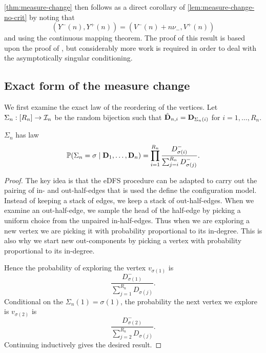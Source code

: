 \cref{thm:measure-change} then follows as a direct corollary of \cref{lem:measure-change-no-crit} by noting that
\begin{equation*}
    \left( 
        Y^-(n), Y^+(n)
     \right) =
    \left( 
        V^-(n) + n \nu_-, V^+(n)
     \right)
\end{equation*}
and using the continuous mapping theorem. The proof of this result is based upon the proof of \cite[Lemma~6.7]{conchon--kerjanStableGraphMetric2020}, but considerably more work is required in order to deal with the asymptotically singular conditioning.

\subsection{Exact form of the measure change}

We first examine the exact law of the reordering of the vertices. Let $\Sigma_n: [R_n] \to {\mathcal I}_n$ be the random bijection such that $\hat{{\mathbf D}}_{n, i} = {\mathbf D}_{\Sigma_n(i)}$ for $i = 1, \ldots, R_n$.

\begin{lemma}
    $\Sigma_n$ has law
    \begin{equation*}
        {\mathbb P}(\Sigma_n = \sigma \mid {\mathbf D}_1, \ldots, {\mathbf D}_n)
        = \prod_{i=1}^{R_n} \frac{D^-_{\sigma(i)}}{\sum_{j=i}^{R_n} D^-_{\sigma(j)}}.
    \end{equation*}
\end{lemma}
\begin{proof}
    The key idea is that the eDFS procedure can be adapted to carry out the pairing of in- and out-half-edges that is used the define the configuration model. Instead of keeping a stack of edges, we keep a stack of out-half-edges. When we examine an out-half-edge, we sample the head of the half-edge by picking a uniform choice from the unpaired in-half-edges. Thus when we are exploring a new vertex we are picking it with probability proportional to its in-degree. This is also why we start new out-components by picking a vertex with probability proportional to its in-degree.

    Hence the probability of exploring the vertex $v_{\sigma(1)}$ is
    \begin{equation*}
        \frac{D_{\sigma(1)}^{-}}{\sum_{j=1}^{R_n} D_{\sigma(j)}}.
    \end{equation*}
    Conditional on the $\Sigma_n(1) = \sigma(1)$, the probability the next vertex we explore is $v_{\sigma(2)}$ is
    \begin{equation*}
        \frac{D_{\sigma(2)}^{-}}{\sum_{j=2}^{R_n} D_{\sigma(j)}}.
    \end{equation*}
    Continuing inductively gives the desired result.
\end{proof}


